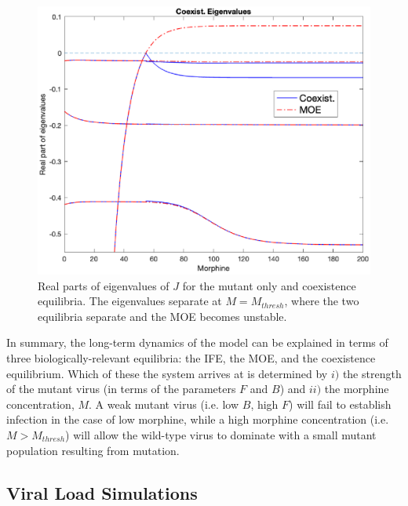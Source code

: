 \documentclass[11pt, oneside]{article}    %
\begin{document}
\begin{figure}[h]
\begin{center}
\includegraphics[scale=0.75]{coex_eigenvs.eps}
\caption{Real parts of eigenvalues of $J$ for the mutant only and coexistence equilibria. The eigenvalues separate at $M=M_{thresh}$, where the two equilibria separate and the MOE becomes unstable.}
\label{fig:coex_eig}
\end{center}
\end{figure}

In summary, the long-term dynamics of the model can be explained in terms of three biologically-relevant equilibria: the IFE, the MOE, and the coexistence equilibrium. Which of these the system arrives at is determined by $i)$ the strength of the mutant virus (in terms of the parameters $F$ and $B$) and $ii)$ the morphine concentration, $M$. A weak mutant virus (i.e. low $B$, high $F$) will fail to establish infection in the case of low morphine, while a high morphine concentration (i.e. $M>M_{thresh}$) will allow the wild-type virus to dominate with a small mutant population resulting from mutation. 


\subsection{Viral Load Simulations}
\end{document}
